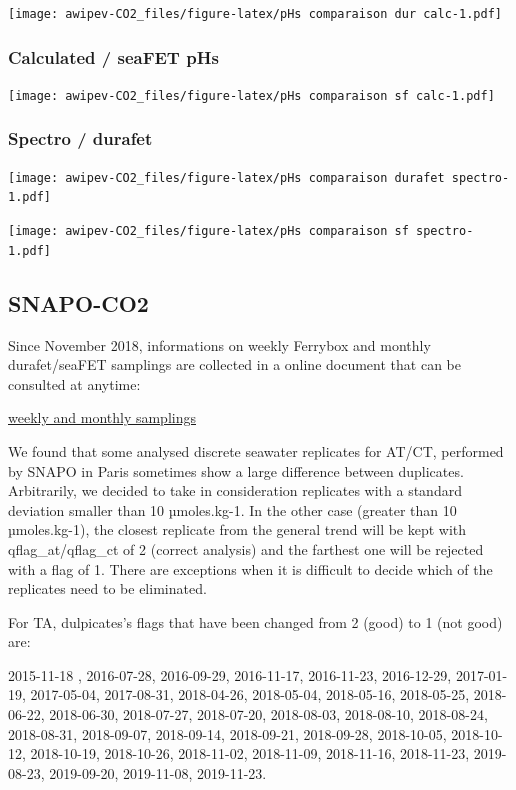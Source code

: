 \documentclass[
]{article}
\begin{document}
\texttt{[image: awipev-CO2\_files/figure-latex/pHs comparaison dur calc-1.pdf]}

\hypertarget{calculated-seafet-phs}{%
\subsubsection{\texorpdfstring{\textbf{Calculated / seaFET
pHs}}{Calculated / seaFET pHs}}\label{calculated-seafet-phs}}

\texttt{[image: awipev-CO2\_files/figure-latex/pHs comparaison sf calc-1.pdf]}

\hypertarget{spectro-durafet}{%
\subsubsection{\texorpdfstring{\textbf{Spectro /
durafet}}{Spectro / durafet}}\label{spectro-durafet}}

\texttt{[image: awipev-CO2\_files/figure-latex/pHs comparaison durafet spectro-1.pdf]}

\texttt{[image: awipev-CO2\_files/figure-latex/pHs comparaison sf spectro-1.pdf]}

\hypertarget{snapo-co2}{%
\subsection{SNAPO-CO2}\label{snapo-co2}}

Since November 2018, informations on weekly Ferrybox and monthly
durafet/seaFET samplings are collected in a online document that can be
consulted at anytime:

\href{https://docs.google.com/spreadsheets/d/1bNh9q4bkNoh2ra78XC451EmGb9Q8kMf4ByBnKngeHOg/edit?usp=sharing}{weekly
and monthly samplings}

We found that some analysed discrete seawater replicates for AT/CT,
performed by SNAPO in Paris sometimes show a large difference between
duplicates. Arbitrarily, we decided to take in consideration replicates
with a standard deviation smaller than 10 µmoles.kg-1. In the other case
(greater than 10 µmoles.kg-1), the closest replicate from the general
trend will be kept with qflag\_at/qflag\_ct of 2 (correct analysis) and
the farthest one will be rejected with a flag of 1. There are exceptions
when it is difficult to decide which of the replicates need to be
eliminated.

For TA, dulpicates's flags that have been changed from 2 (good) to 1
(not good) are:

2015-11-18 , 2016-07-28, 2016-09-29, 2016-11-17, 2016-11-23, 2016-12-29,
2017-01-19, 2017-05-04, 2017-08-31, 2018-04-26, 2018-05-04, 2018-05-16,
2018-05-25, 2018-06-22, 2018-06-30, 2018-07-27, 2018-07-20, 2018-08-03,
2018-08-10, 2018-08-24, 2018-08-31, 2018-09-07, 2018-09-14, 2018-09-21,
2018-09-28, 2018-10-05, 2018-10-12, 2018-10-19, 2018-10-26, 2018-11-02,
2018-11-09, 2018-11-16, 2018-11-23, 2019-08-23, 2019-09-20, 2019-11-08,
2019-11-23.
\end{document}
